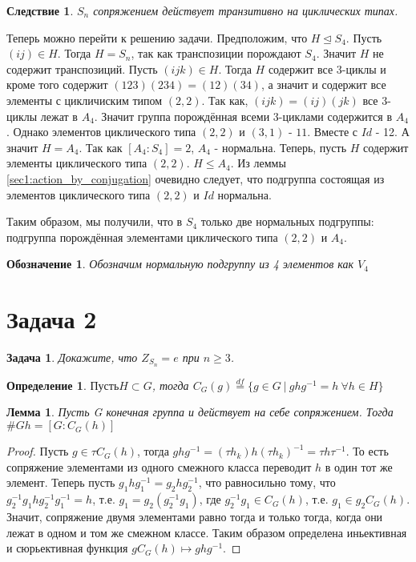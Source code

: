 \documentclass{article}
\newtheorem{task}{Задача}
\newtheorem{df}{Определение}
\newtheorem{lemma}{Лемма}
\newtheorem{cq}{Следствие}
\newtheorem{localdf}{Обозначение}
\newcommand{\ad}[2]{#1#2#1^{-1}}
\newcommand{\dfeq}{\overset{df}{=}}
\newcommand{\normalin}{\trianglelefteq}
\newcommand{\subgroup}{\leq}
\begin{document}
\begin{cq}
$S_n$ сопряжением действует транзитивно на циклических типах.
\end{cq}
Теперь можно перейти к решению задачи. 
Предположим, что $H \normalin S_4$.
Пусть $(ij) \in H$. Тогда $H = S_n$, так как транспозиции порождают $S_4$.
Значит $H$ не содержит транспозиций. 
Пусть $(ijk) \in H$. Тогда $H$ содержит все 3-циклы и кроме того содержит  
$(123)(234) = (12)(34)$, а значит и содержит все элементы с цикличиским типом $(2, 2)$.
Так как, $(ijk) = (ij)(jk)$ все 3-циклы лежат в $A_4$. 
Значит группа порождённая всеми 3-циклами содержится в $A_4$.
Однако элементов циклического типа $(2, 2)$ и $(3, 1)$ - $11$. Вместе с $Id$ - 12.
А значит $H = A_4$. Так как $[A_4: S_4] = 2$, $A_4$ - нормальна.
Теперь, пусть $H$ содержит элементы циклического типа $(2, 2)$. $H \subgroup A_4$. 
Из леммы \ref{sec1:action_by_conjugation} очевидно следует, что подгруппа состоящая из элементов циклического типа $(2, 2)$ и $Id$ нормальна.

Таким образом, мы получили, что в $S_4$ только две нормальных подгруппы: подгруппа порождённая элементами циклического типа $(2, 2)$ и $A_4$.

\begin{localdf}
Обозначим нормальную подгруппу из 4 элементов как $V_4$ 
\end{localdf}

\section*{Задача 2}

\begin{task}
Докажите, что $Z_{S_n} = {e}$ при $n \geq 3$.
\end{task}

\begin{df}
    $Пусть H \subset G$, тогда $C_G(g) \dfeq \{g \in G ~ | ~ \ad{g}{h} = h ~ \forall h \in H\}$
\end{df}

\begin{lemma}
Пусть G конечная группа и действует на себе сопряжением.
Тогда $\#Gh = [G: C_{G}(h)]$ 
\end{lemma}

\begin{proof}
Пусть $g \in \tau C_{G}(h)$, тогда $\ad{g}{h} = \ad{(\tau h_k)}{h} = \ad{\tau}{h}$.
То есть сопряжение элементами из одного смежного класса переводит $h$ в один тот же элемент.
Теперь пусть $\ad{g_1}{h} = \ad{g_2}{h}$, что равносильно тому, что $\ad{g_2^{-1}g_1}{h} = h$, 
т.е. $g_1 = g_2 (g_2^{-1} g_1)$, где $g_2^{-1} g_1 \in C_{G}(h)$, т.е. $g_1 \in g_2 C_{G}(h)$.
Значит, сопряжение двумя элементами равно тогда и только тогда, когда они лежат 
в одном и том же смежном классе. Таким образом определена иньективная и сюрьективная функция 
$g C_{G}(h) \mapsto \ad{g}{h}$.
\end{proof}
\end{document}
